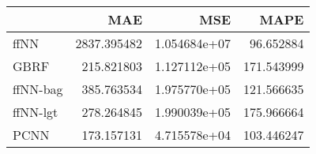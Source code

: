 \begin{tabular}{lrrr}
\toprule
{} &          MAE &           MSE &        MAPE \\
\midrule
ffNN     &  2837.395482 &  1.054684e+07 &   96.652884 \\
GBRF     &   215.821803 &  1.127112e+05 &  171.543999 \\
ffNN-bag &   385.763534 &  1.975770e+05 &  121.566635 \\
ffNN-lgt &   278.264845 &  1.990039e+05 &  175.966664 \\
PCNN     &   173.157131 &  4.715578e+04 &  103.446247 \\
\bottomrule
\end{tabular}
